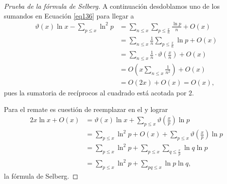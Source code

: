 \begin{proof}[Prueba de la f\'ormula de Selberg]
A continuaci\'on desdoblamos uno de los sumandos en Ecuaci\'on \ref{eq136} para llegar a 
\begin{align}
\vartheta(x)\ln x - \sum_{p \leq x} \ln^2 p &= \sum_{n \leq x} \sum_{p \leq \frac{x}{n}} \frac{\ln p}{n} + O(x) \\
&= \sum_{n \leq x} \frac{1}{n}\sum_{p \leq \frac{x}{n}} \ln p + O(x) \\
&= \sum_{n \leq x} \frac{1}{n}\cdot \vartheta\left(\frac{x}{n}\right) + O(x) \\
&= O\left(x \sum_{n \leq x} \frac{1}{n^2}\right) + O(x) \\
&= O(2x)+O(x)=O(x), 
\end{align}
pues la sumatoria de rec\'iprocos al cuadrado est\'a acotada por $2$. 

Para el remate es cuesti\'on de reemplazar en el  y lograr  
\begin{align}
2x\ln x + O(x) &= \vartheta(x)\ln x + \sum_{p \leq x} \vartheta\left(\frac{x}{p}\right)\ln p  \\
&= \sum_{p \leq x} \ln^2 p + O(x) + \sum_{p \leq x} \vartheta\left(\frac{x}{p}\right)\ln p  \\
&= \sum_{p \leq x} \ln^2 p + \sum_{p \leq x} \sum_{q \leq \frac{x}{p}} \ln q \ln p  \\
&= \sum_{p \leq x} \ln^2 p + \sum_{pq \leq x} \ln p \ln q, 
\end{align}
la f\'ormula de Selberg.
\end{proof}
